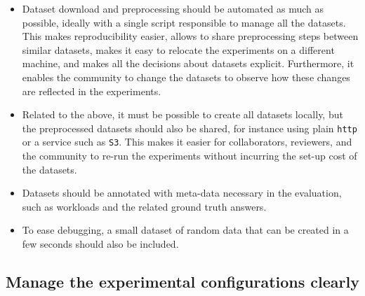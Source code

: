 \documentclass{llncs}
\begin{document}
\begin{itemize}
\item Dataset download and preprocessing should be automated as much as possible,
  ideally with a single script responsible to manage all the datasets.
  This makes reproducibility easier, allows to share preprocessing steps between similar datasets,
  makes it easy to relocate the experiments on a different machine, and makes all the
  decisions about datasets explicit.
  Furthermore, it enables the community to change the datasets to observe how these changes
  are reflected in the experiments.
\item Related to the above, it must be possible to create all datasets locally, 
  but the preprocessed datasets should also be shared, for instance using plain 
  \texttt{http} or a service such as \texttt{S3}.
  This makes it easier for collaborators, reviewers, and the community to re-run the
  experiments without incurring the set-up cost of the datasets.
\item Datasets should be annotated with meta-data necessary in the evaluation, 
  such as workloads and the related ground truth answers.
\item To ease debugging, a small dataset of random data that can be created in a few
  seconds should also be included.
\end{itemize}


\subsection{Manage the experimental configurations clearly}
\end{document}
